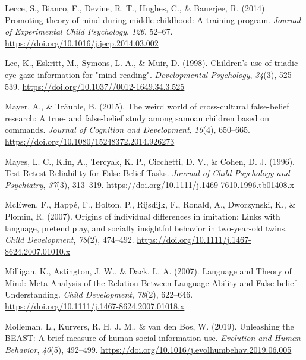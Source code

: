 \documentclass[
  man,floatsintext]{apa6}
\newlength{\cslhangindent}
\newlength{\cslentryspacingunit} %
\newenvironment{CSLReferences}[2] %
 {%
  \setlength{\parindent}{0pt}
  \ifodd #1
  \let\oldpar\par
  \def\par{\hangindent=\cslhangindent\oldpar}
  \fi
  \setlength{\parskip}{#2\cslentryspacingunit}
 }%
 {}
\begin{document}
\begin{CSLReferences}{1}{0}
\leavevmode{}%
Lecce, S., Bianco, F., Devine, R. T., Hughes, C., \& Banerjee, R. (2014). Promoting theory of mind during middle childhood: {A} training program. \emph{Journal of Experimental Child Psychology}, \emph{126}, 52--67. \url{https://doi.org/10.1016/j.jecp.2014.03.002}

\leavevmode{}%
Lee, K., Eskritt, M., Symons, L. A., \& Muir, D. (1998). Children's use of triadic eye gaze information for "mind reading". \emph{Developmental Psychology}, \emph{34}(3), 525--539. \url{https://doi.org/10.1037//0012-1649.34.3.525}

\leavevmode{}%
Mayer, A., \& Träuble, B. (2015). The weird world of cross-cultural false-belief research: {A} true- and false-belief study among samoan children based on commands. \emph{Journal of Cognition and Development}, \emph{16}(4), 650--665. \url{https://doi.org/10.1080/15248372.2014.926273}

\leavevmode{}%
Mayes, L. C., Klin, A., Tercyak, K. P., Cicchetti, D. V., \& Cohen, D. J. (1996). Test-{Retest Reliability} for {False-Belief Tasks}. \emph{Journal of Child Psychology and Psychiatry}, \emph{37}(3), 313--319. \url{https://doi.org/10.1111/j.1469-7610.1996.tb01408.x}

\leavevmode{}%
McEwen, F., Happé, F., Bolton, P., Rijsdijk, F., Ronald, A., Dworzynski, K., \& Plomin, R. (2007). Origins of individual differences in imitation: Links with language, pretend play, and socially insightful behavior in two-year-old twins. \emph{Child Development}, \emph{78}(2), 474--492. \url{https://doi.org/10.1111/j.1467-8624.2007.01010.x}

\leavevmode{}%
Milligan, K., Astington, J. W., \& Dack, L. A. (2007). Language and {Theory} of {Mind}: {Meta-Analysis} of the {Relation Between Language Ability} and {False-belief Understanding}. \emph{Child Development}, \emph{78}(2), 622--646. \url{https://doi.org/10.1111/j.1467-8624.2007.01018.x}

\leavevmode{}%
Molleman, L., Kurvers, R. H. J. M., \& van den Bos, W. (2019). Unleashing the {BEAST}: A brief measure of human social information use. \emph{Evolution and Human Behavior}, \emph{40}(5), 492--499. \url{https://doi.org/10.1016/j.evolhumbehav.2019.06.005}


\end{CSLReferences}
\end{document}
